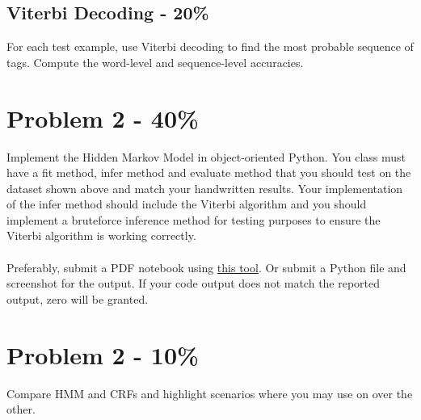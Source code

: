\documentclass{article}
\newcommand{\answerboxbig}{
    \vspace{20cm} %
}
\begin{document}
\subsection*{Viterbi Decoding - 20\%}
For each test example, use Viterbi decoding to find the most probable sequence of tags. Compute the word-level and sequence-level accuracies.
\answerboxbig

\section*{Problem 2 - 40\%}
Implement the Hidden Markov Model in object-oriented Python. You class must have a fit method, infer method and evaluate method that you should test on the dataset shown above and match your handwritten results. Your implementation of the infer method should include the Viterbi algorithm and you should implement a bruteforce inference method for testing purposes to ensure the Viterbi algorithm is working correctly.
\\
\\
Preferably, submit a PDF notebook using \hyperlink{https://htmtopdf.herokuapp.com/ipynbviewer/#google_vignette}{this tool}. Or submit a Python file and screenshot for the output. If your code output does not match the reported output, zero will be granted.

\section*{Problem 2 - 10\%}
Compare HMM and CRFs and highlight scenarios where you may use on over the other.
\end{document}

